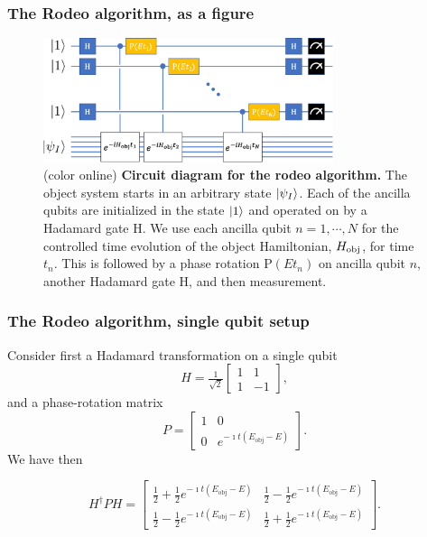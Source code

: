 \documentclass{beamer}
\begin{document}
\begin{frame}
\frametitle{The Rodeo algorithm, as a figure}

\begin{figure}
\centering
\includegraphics[width=8.5cm]{rodeofigs/rodeo_circuit.png}
\caption{(color online) {\bf Circuit diagram for the rodeo algorithm.} The object system starts in an arbitrary state $\ket{\psi_I}$.  Each of the ancilla qubits are initialized in the state $\ket{1}$ and operated on by a Hadamard gate H.  We use each ancilla qubit $n=1, \cdots, N$ for the controlled time evolution of the object Hamiltonian, $H_{\rm obj}$, for time $t_n$.  This is followed by a phase rotation P$(Et_n)$ on ancilla qubit $n$, another Hadamard gate H, and then measurement.}
\label{rodeo_circuit}
\end{figure} 

\end{frame}


\begin{frame}
\frametitle{The Rodeo algorithm, single qubit setup}
Consider first a Hadamard transformation on a single qubit
\[
H=\tfrac{1}{\sqrt{2}}\begin{bmatrix} 1 & 1 \\ 1 & -1\end{bmatrix},
\]
and a phase-rotation matrix
\[
P=\begin{bmatrix} 1 & 0 \\ 0 & e^{-\imath t(E_{\mathrm{obj}}-E)}\end{bmatrix}.
\]
We have then

\[
H^{\dagger}PH=\begin{bmatrix} \tfrac{1}{2}+\tfrac{1}{2}e^{-\imath t(E_{\mathrm{obj}}-E)} & \tfrac{1}{2}-\tfrac{1}{2}e^{-\imath t(E_{\mathrm{obj}}-E)} \\ \tfrac{1}{2}-\tfrac{1}{2}e^{-\imath t(E_{\mathrm{obj}}-E)}  & \tfrac{1}{2}+\tfrac{1}{2}e^{-\imath t(E_{\mathrm{obj}}-E)}\end{bmatrix}.
\]
\end{frame}
\end{document}
